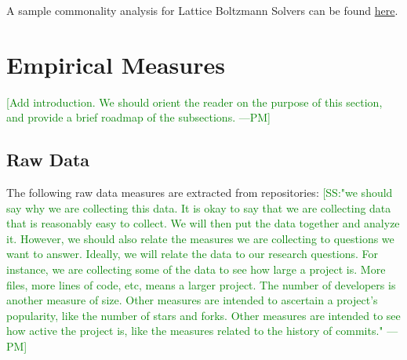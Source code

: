 \documentclass[letterpaper,cleveref]{lipics-v2019}
\newcommand{\authornote}[3]{\textcolor{#1}{[#3 ---#2]}}
\newcommand{\authornote}[3]{}
\newcommand{\pmi}[1]{\authornote{green}{PM}{#1}} %
\theoremstyle{definition}
\begin{document}
A sample commonality analysis for Lattice Boltzmann Solvers can be found
\href{https://github.com/smiths/AIMSS/blob/master/StateOfPractice/Peter-Notes/Commonality-Analysis-LB-Systems.pdf}{here}.

\section{Empirical Measures} \label{SecEmpiricalMeasures}
\pmi{Add introduction.  We should orient the reader on the purpose of this section, and provide a brief roadmap of the subsections.}

\subsection{Raw Data}
The following raw data measures are extracted from repositories:
\pmi{SS:"we should say why we are collecting this data. It is okay to say that we are collecting data that is reasonably easy to collect. We will then put the data together and analyze it. However, we should also relate the measures we are collecting to questions we want to answer. Ideally, we will relate the data to our research questions. For instance, we are collecting some of the data to see how large a project is. More files, more lines of code, etc, means a larger project. The number of developers is another measure of size. Other measures are intended to ascertain a project's popularity, like the number of stars and forks. Other measures are intended to see how active the project is, like the measures related to the history of commits."}
\end{document}
